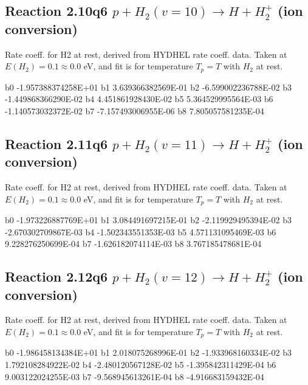 \documentclass[12pt,dvipdfmx]{article}
\begin{document}
\newpage
\subsection{
Reaction 2.10q6
$ p + H_2(v=10) \rightarrow H + H_2^+$ (ion conversion)
}
Rate coeff. for H2 at rest, derived from HYDHEL rate coeff. data.
Taken at $E(H_2) = 0.1 \approx 0.0$ eV,  and fit is for temperature $T_p=T$ with $H_2$ at rest.

\begin{{small}}\begin{{verbatim}}

  b0 -1.957388374258E+01  b1  3.639366382569E-01  b2 -6.599002236788E-02
  b3 -1.449868366290E-02  b4  4.451861928430E-02  b5  5.364529995564E-03
  b6 -1.140573032372E-02  b7 -7.157493006955E-06  b8  7.805057581235E-04

\end{{verbatim}}\end{{small}}

\newpage
\subsection{
Reaction 2.11q6
$ p + H_2(v=11) \rightarrow H + H_2^+$ (ion conversion)
}
Rate coeff. for H2 at rest, derived from HYDHEL rate coeff. data.
Taken at $E(H_2) = 0.1 \approx 0.0$ eV,  and fit is for temperature $T_p=T$ with $H_2$ at rest.

\begin{{small}}\begin{{verbatim}}

  b0 -1.973226887769E+01  b1  3.084491697215E-01  b2 -2.119929495394E-02
  b3 -2.670302709867E-03  b4 -1.502343551353E-03  b5  4.571131095469E-03
  b6  9.228276250699E-04  b7 -1.626182074114E-03  b8  3.767185478681E-04

\end{{verbatim}}\end{{small}}

\newpage
\subsection{
Reaction 2.12q6
$ p + H_2(v=12) \rightarrow H + H_2^+$ (ion conversion)
}
Rate coeff. for H2 at rest, derived from HYDHEL rate coeff. data.
Taken at $E(H_2) = 0.1 \approx 0.0$ eV,  and fit is for temperature $T_p=T$ with $H_2$ at rest.

\begin{{small}}\begin{{verbatim}}

  b0 -1.986458134384E+01  b1  2.018075268996E-01  b2 -1.933968160334E-02
  b3  1.792108284922E-02  b4 -2.480120567128E-02  b5 -1.395842311429E-04
  b6  9.003122024255E-03  b7 -9.568945613261E-04  b8 -4.916683159432E-04

\end{{verbatim}}\end{{small}}
\end{document}
